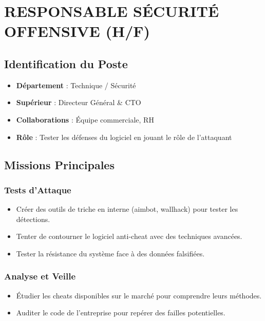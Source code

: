 \documentclass[12pt,a4paper]{article}
\begin{document}
\section{RESPONSABLE SÉCURITÉ OFFENSIVE (H/F)}

\subsection{Identification du Poste}
\begin{itemize}[label=\textbullet]
    \item \textbf{Département} : Technique / Sécurité
    \item \textbf{Supérieur} : Directeur Général \& CTO
    \item \textbf{Collaborations} : Équipe commerciale, RH
    \item \textbf{Rôle} : Tester les défenses du logiciel en jouant le rôle de l'attaquant
\end{itemize}

\subsection{Missions Principales}

\subsubsection{Tests d'Attaque}
\begin{itemize}[label=\textbullet]
    \item Créer des outils de triche en interne (aimbot, wallhack) pour tester les détections.
    \item Tenter de contourner le logiciel anti-cheat avec des techniques avancées.
    \item Tester la résistance du système face à des données falsifiées.
\end{itemize}

\subsubsection{Analyse et Veille}
\begin{itemize}[label=\textbullet]
    \item Étudier les cheats disponibles sur le marché pour comprendre leurs méthodes.
    \item Auditer le code de l'entreprise pour repérer des failles potentielles.
\end{itemize}
\end{document}
